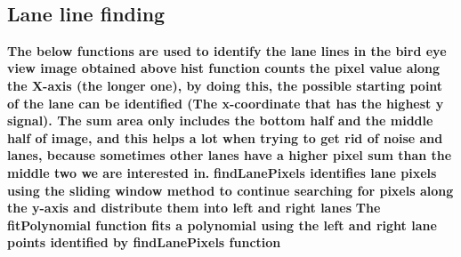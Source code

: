\documentclass[11pt]{article}
\begin{document}
    \begin{center}
    \end{center}
    { \hspace*{\fill} \\}
    
    \hypertarget{lane-line-finding}{%
\subsection{Lane line finding}\label{lane-line-finding}}

\textbf{The below functions are used to identify the lane lines in the
bird eye view image obtained above} \textbf{hist function counts the
pixel value along the X-axis (the longer one), by doing this, the
possible starting point of the lane can be identified (The x-coordinate
that has the highest y signal). The sum area only includes the bottom
half and the middle half of image, and this helps a lot when trying to
get rid of noise and lanes, because sometimes other lanes have a higher
pixel sum than the middle two we are interested in.}
\textbf{findLanePixels identifies lane pixels using the sliding window
method to continue searching for pixels along the y-axis and distribute
them into left and right lanes} \textbf{The fitPolynomial function fits
a polynomial using the left and right lane points identified by
findLanePixels function}
\end{document}
